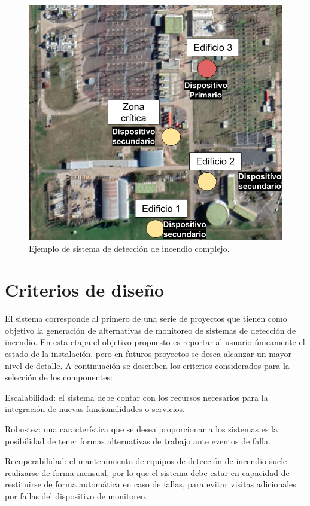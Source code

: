 \begin{figure}[]
	\centering
	\includegraphics[scale=.4]{./Figures/Capitulo3/Fig_A3.png}
	\caption{Ejemplo de sistema de detección de incendio complejo.}
	\label{fig:figura_a3}
\end{figure}

\section{Criterios de diseño}
\label{criterios}
El sistema corresponde al primero de una serie de proyectos que tienen como objetivo la generación de alternativas de monitoreo de sistemas de detección de incendio. En esta etapa el objetivo propuesto es reportar al usuario únicamente el estado de la instalación, pero en futuros proyectos se desea alcanzar un mayor nivel de detalle. A continuación se describen los criterios considerados para la selección de los componentes:

Escalabilidad: el sistema debe contar con los recursos necesarios para la integración de nuevas funcionalidades o servicios.

Robustez: una característica que se desea proporcionar a los sistemas es la posibilidad de tener formas alternativas de trabajo ante eventos de falla.

Recuperabilidad: el mantenimiento de equipos de detección de incendio suele realizarse de forma mensual, por lo que el sistema debe estar en capacidad de restituirse de forma automática en caso de fallas, para evitar visitas adicionales por fallas del dispositivo de monitoreo.

